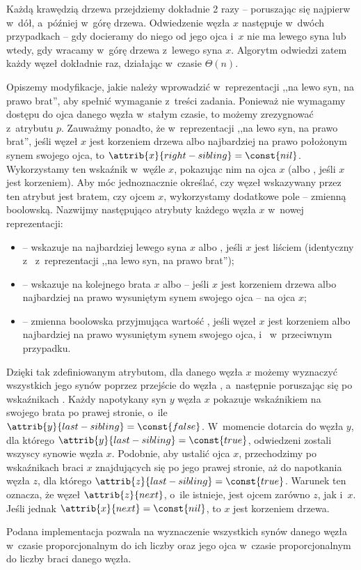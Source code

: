 Każdą krawędzią drzewa przejdziemy dokładnie 2 razy -- poruszając się najpierw w~dół, a~później w~górę drzewa.
Odwiedzenie węzła $x$ następuje w~dwóch przypadkach -- gdy docieramy do niego od jego ojca i~$x$ nie ma lewego syna lub wtedy, gdy wracamy w~górę drzewa z~lewego syna $x$.
Algorytm odwiedzi zatem każdy węzeł dokładnie raz, działając w~czasie $\Theta(n)$.

\exercise %

\noindent Opiszemy modyfikacje, jakie należy wprowadzić w~reprezentacji ,,na lewo syn, na prawo brat'', aby spełnić wymaganie z~treści zadania.
Ponieważ nie wymagamy dostępu do ojca danego węzła w~stałym czasie, to możemy zrezygnować z~atrybutu $p$.
Zauważmy ponadto, że w~reprezentacji ,,na lewo syn, na prawo brat'', jeśli węzeł $x$ jest korzeniem drzewa albo najbardziej na prawo położonym synem swojego ojca, to $\attrib{x}{right-sibling}=\const{nil}$.
Wykorzystamy ten wskaźnik w~węźle $x$, pokazując nim na ojca $x$ (albo , jeśli $x$ jest korzeniem).
Aby móc jednoznacznie określać, czy węzeł wskazywany przez ten atrybut jest bratem, czy ojcem $x$, wykorzystamy dodatkowe pole -- zmienną boolowską.
Nazwijmy następująco atrybuty każdego węzła $x$ w~nowej reprezentacji:
\begin{itemize}
	\item {} -- wskazuje na najbardziej lewego syna $x$ albo , jeśli $x$ jest liściem (identyczny z~ z~reprezentacji ,,na lewo syn, na prawo brat'');
	\item {} -- wskazuje na kolejnego brata $x$ albo -- jeśli $x$ jest korzeniem drzewa albo najbardziej na prawo wysuniętym synem swojego ojca -- na ojca $x$;
	\item {} -- zmienna boolowska przyjmująca wartość , jeśli węzeł $x$ jest korzeniem albo najbardziej na prawo wysuniętym synem swojego ojca, i~ w~przeciwnym przypadku.
\end{itemize}

Dzięki tak zdefiniowanym atrybutom, dla danego węzła $x$ możemy wyznaczyć wszystkich jego synów poprzez przejście do węzła , a~następnie poruszając się po wskaźnikach .
Każdy napotykany syn $y$ węzła $x$ pokazuje wskaźnikiem  na swojego brata po prawej stronie, o~ile $\attrib{y}{last-sibling}=\const{false}$.
W~momencie dotarcia do węzła $y$, dla którego $\attrib{y}{last-sibling}=\const{true}$, odwiedzeni zostali wszyscy synowie węzła $x$.
Podobnie, aby ustalić ojca $x$, przechodzimy po wskaźnikach  braci $x$ znajdujących się po jego prawej stronie, aż do napotkania węzła $z$, dla którego $\attrib{z}{last-sibling}=\const{true}$.
Warunek ten oznacza, że węzeł $\attrib{z}{next}$, o~ile istnieje, jest ojcem zarówno $z$, jak i~$x$.
Jeśli jednak $\attrib{x}{next}=\const{nil}$, to $x$ jest korzeniem drzewa.

Podana implementacja pozwala na wyznaczenie wszystkich synów danego węzła w~czasie proporcjonalnym do ich liczby oraz jego ojca w~czasie proporcjonalnym do liczby braci danego węzła.
